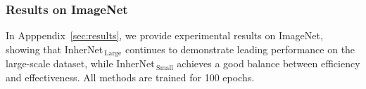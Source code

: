 \documentclass{article} %
\begin{document}








\subsubsection{Results on ImageNet}

In Apppendix~\ref{sec:results}, we provide experimental results on ImageNet, showing that InherNet$_{\ \text{Large}}$ continues to demonstrate leading performance on the large-scale dataset, while InherNet$_{\ \text{Small}}$ achieves a good balance between efficiency and effectiveness. All methods are trained for 100 epochs.


\end{document}
